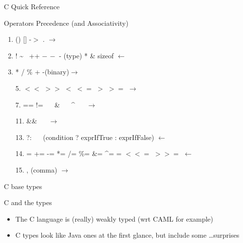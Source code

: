 \begin{Coupe}
\begin{frame}[squeeze]{C Quick Reference}
  \begin{block}{Operators Precedence (and Associativity)}
    \begin{enumerate}\vspace{-.2\baselineskip}
    \item {} ()     []
      -$>$  . \hfill $\rightarrow$
    \item {} ! \textasciitilde\  ++    $-\,-$  
       -  (type)   *
      \& sizeof \hfill $\leftarrow$
    \item {} * / \% \hspace{13mm}  + -(binary)\hfill $\rightarrow$
    \item[5.]  $<<$    $>>$ \hspace{13mm}
        $<$    $<=$      $>$   $>=$
      \hfill $\rightarrow$
    \item[7.]  == != ~~ \&
      ~~ \^{} ~~ \textbar
      \hfill $\rightarrow$
    \item[11.]  \&\& ~~ \textbar\textbar
        \hfill $\rightarrow$
    \item[13.]  ?: ~~ (condition ? exprIfTrue : exprIfFalse)
      \hfill $\leftarrow$
    \item[14.] 
       =    +=      -=   *=  /=   \%=  \&=   \^{}=  \textbar=   $<<=$   $>>=$
      \hfill $\leftarrow$
    \item[15.]  , (comma)
      \hfill $\rightarrow$
    \end{enumerate}
  \end{block}\vspace{-.2\baselineskip}

\end{frame}

\begin{frame}{C base types}
  \begin{block}{C and the types}
    \begin{itemize}
    \item The C language is (really) weakly typed (wrt CAML for example)
    \item C types look like Java ones at the first glance, but include some
      \ldots surprises
    \end{itemize}
  \end{block}


\end{frame}
\end{Coupe}
